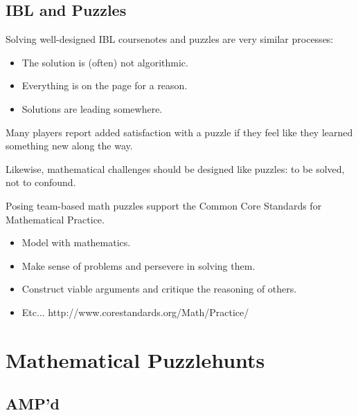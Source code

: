 \documentclass{beamer}
\newcommand{\vpause}{\pause\vspace{1em}}
\begin{document}
\subsection{IBL and Puzzles}

\begin{frame}
  Solving well-designed IBL coursenotes and puzzles
  are very similar processes:

  \pause

  \begin{itemize}
    \item The solution is (often) not algorithmic.
    \pause
    \item Everything is on the page for a reason.
    \pause
    \item Solutions are leading somewhere.
  \end{itemize}
\end{frame}

\begin{frame}
  Many players report added satisfaction with a puzzle if they feel like they
  learned something new along the way.

  \vpause

  Likewise, mathematical challenges should be designed like
  puzzles: to be solved, not to confound.
\end{frame}

\begin{frame}
  Posing team-based math puzzles support the
  Common Core Standards for Mathematical Practice.

  \pause

  \begin{itemize}
    \item Model with mathematics.
    \pause
    \item Make sense of problems and persevere in solving them.
    \pause
    \item Construct viable arguments and critique the reasoning of others.
    \pause
    \item Etc...
          http://www.corestandards.org/Math/Practice/
  \end{itemize}
\end{frame}

\section{Mathematical Puzzlehunts}

\subsection{AMP'd}
\end{document}
